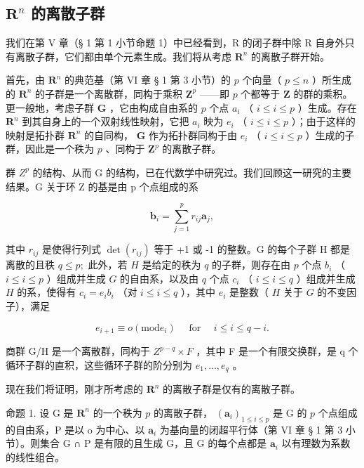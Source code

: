 \subsection{\texorpdfstring{\(\mathbf{R}^n\) 的离散子群}{R 的 n 次幂的离散子群}}

我们在第 V 章（§ 1 第 1 小节命题 1）中已经看到，R 的闭子群中除 R 自身外只有离散子群，它们都由单个元素生成。我们将从考虑 \(\mathbf{R}^n\) 的离散子群开始。

首先，由 \(\mathbf{R}^n\) 的典范基（第 VI 章 § 1 第 3 小节）的 \(p\) 个向量（ \(p \leqslant n\) ）所生成的 \(\mathbf{R}^n\) 的子群是一个离散群，同构于乘积 \(\mathbf{Z}^p\) ——即 \(p\) 个都等于 \(\mathbf{Z}\) 的群的乘积。更一般地，考虑子群 \(\mathbf{G}\) ，它由构成自由系的 \(p\) 个点 \(a_i\) （ \(i \leqslant i \leqslant p\) ）生成。存在 \(\mathbf{R}^n\) 到其自身上的一个双射线性映射，它把 \(a_i\) 映为 \(e_i\) （ \(i \leqslant i \leqslant p\) ）；由于这样的映射是拓扑群 \(\mathbf{R}^n\) 的自同构， \(\mathbf{G}\) 作为拓扑群同构于由 \(e_i\) （ \(i \leqslant i \leqslant p\) ）生成的子群，因此是一个秩为 \(p\) 、同构于 \(\mathbf{Z}^p\) 的离散子群。

群 \(Z^{p}\) 的结构、从而 G 的结构，已在代数学中研究过。我们回顾这一研究的主要结果。G 关于环 Z 的基是由 p 个点组成的系

\[
\boldsymbol {b} _ {i} = \sum_ {j = 1} ^ {p} r _ {i j} \boldsymbol {a} _ {j},
\]

其中 \(r_{ij}\) 是使得行列式 \(\det(r_{ij})\) 等于 +1 或 -1 的整数。G 的每个子群 H 都是离散的且秩 \(q \leqslant p;\) 此外，若 \(H\) 是给定的秩为 \(q\) 的子群，则存在由 \(p\) 个点 \(b_i\) （ \(i \leqslant i \leqslant p\) ）组成并生成 \(G\) 的自由系，以及由 \(q\) 个点 \(c_i\) （ \(i \leqslant i \leqslant q\) ）组成并生成 \(H\) 的系，使得有 \(c_i = e_i b_i\) （对 \(i \leqslant i \leqslant q\) ），其中 \(e_i\) 是整数（ \(H\) 关于 \(G\) 的不变因子），满足

\[
e _ {i + 1} \equiv o (\mathrm{mod} e _ {i}) \quad \text { for } \quad i \leqslant i \leqslant q - i.
\]

商群 G/H 是一个离散群，同构于 \(Z^{p-q} \times F\) ，其中 F 是一个有限交换群，是 q 个循环子群的直积，这些循环子群的阶分别为 \(e_{1}, \ldots, e_{q}\) 。

现在我们将证明，刚才所考虑的 \(\mathbf{R}^n\) 的离散子群是仅有的离散子群。

命题 1. 设 G 是 \(\mathbf{R}^n\) 的一个秩为 \(p\) 的离散子群， \((\boldsymbol{a}_i)_{1 \leqslant i \leqslant p}\) 是 G 的 \(p\) 个点组成的自由系，P 是以 o 为中心、以 \(\boldsymbol{a}_i\) 为基向量的闭超平行体（第 VI 章 § 1 第 3 小节）。则集合 G ∩ P 是有限的且生成 G，且 G 的每个点都是 \(\boldsymbol{a}_i\) 以有理数为系数的线性组合。

